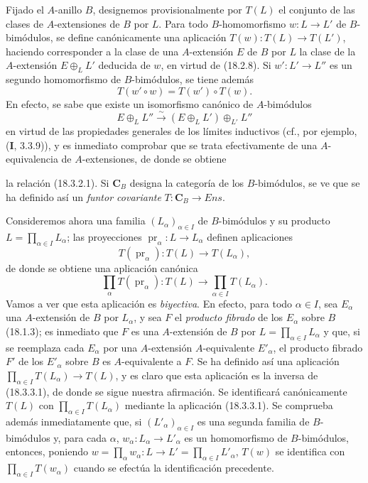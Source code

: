 \begin{env}[18.3.2]
\label{0.18.3.2-fr}
Fijado el $A$-anillo $B$, designemos provisionalmente por $T(L)$ el conjunto
de las clases de $A$-extensiones de $B$ por $L$. Para todo $B$-homomorfismo
$w:L\to L'$ de $B$-bimódulos, se define canónicamente una aplicación
$T(w):T(L)\to T(L')$, haciendo corresponder a la clase de una $A$-extensión
$E$ de $B$ por $L$ la clase de la $A$-extensión $E\oplus_LL'$ deducida de
$w$, en virtud de (18.2.8). Si $w':L'\to L''$ es un segundo homomorfismo
de $B$-bimódulos, se tiene además
\begin{equation}
\label{0.18.3.2.1-fr}
\tag{18.3.2.1}
  T(w'\circ w)=T(w')\circ T(w).
\end{equation}
En efecto, se sabe que existe un isomorfismo canónico de $A$-bimódulos
\[
  E\oplus_LL''\xrightarrow{\sim}(E\oplus_LL')\oplus_{L'}L''
\]
en virtud de las propiedades generales de los límites inductivos (cf., por
ejemplo, (\textbf{I}, 3.3.9)), y es inmediato comprobar que se trata
efectivamente de una $A$-equivalencia de $A$-extensiones, de donde se obtiene


la relación (18.3.2.1). Si $\boldsymbol{C}_B$ designa la categoría de los
$B$-bimódulos, se ve que se ha definido así un \emph{funtor covariante}
$T:\boldsymbol{C}_B\to\boldsymbol{\mathit{Ens}}$.
\end{env}

\begin{env}[18.3.3]
\label{0.18.3.3-fr}
Consideremos ahora una familia $(L_\alpha)_{\alpha\in I}$ de $B$-bimódulos y
su producto $L=\prod_{\alpha\in I}L_\alpha$; las proyecciones
$\operatorname{pr}_\alpha:L\to L_\alpha$ definen aplicaciones
\[
  T(\operatorname{pr}_\alpha):T(L)\to T(L_\alpha),
\]
de donde se obtiene una aplicación canónica
\begin{equation}
\label{0.18.3.3.1-fr}
\tag{18.3.3.1}
  \prod_\alpha T(\operatorname{pr}_\alpha):T(L)
  \longrightarrow\prod_{\alpha\in I}T(L_\alpha).
\end{equation}
Vamos a ver que esta aplicación es \emph{biyectiva}. En efecto, para todo
$\alpha\in I$, sea $E_\alpha$ una $A$-extensión de $B$ por $L_\alpha$, y sea
$F$ el \emph{producto fibrado} de los $E_\alpha$ sobre $B$ (18.1.3); es
inmediato que $F$ es una $A$-extensión de $B$ por
$L=\prod_{\alpha\in I}L_\alpha$ y que, si se reemplaza cada $E_\alpha$ por una
$A$-extensión $A$-equivalente $E'_\alpha$, el producto fibrado $F'$ de los
$E'_\alpha$ sobre $B$ es $A$-equivalente a $F$. Se ha definido así una
aplicación $\prod_{\alpha\in I}T(L_\alpha)\to T(L)$, y es claro que esta
aplicación es la inversa de (18.3.3.1), de donde se sigue nuestra afirmación.
Se identificará canónicamente $T(L)$ con
$\prod_{\alpha\in I}T(L_\alpha)$ mediante la aplicación (18.3.3.1). Se
comprueba además inmediatamente que, si $(L'_\alpha)_{\alpha\in I}$ es una
segunda familia de $B$-bimódulos y, para cada $\alpha$,
$w_\alpha:L_\alpha\to L'_\alpha$ es un homomorfismo de $B$-bimódulos,
entonces, poniendo
$w=\prod_\alpha w_\alpha:L\to L'=\prod_{\alpha\in I}L'_\alpha$, $T(w)$ se
identifica con $\prod_{\alpha\in I}T(w_\alpha)$ cuando se efectúa la
identificación precedente.
\end{env}

